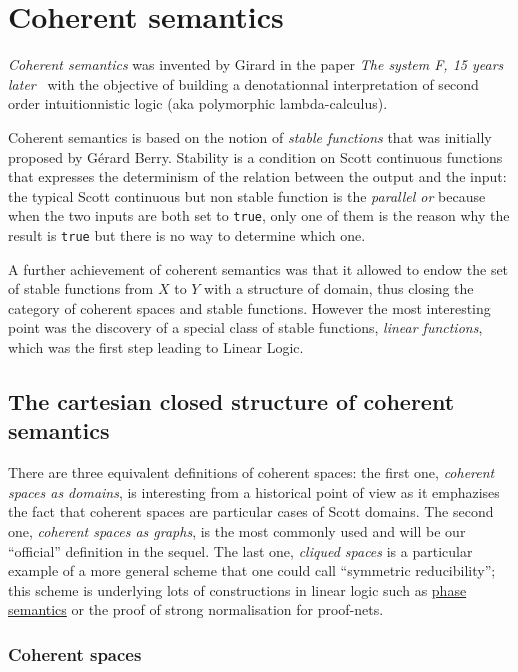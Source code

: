 \chapter{Coherent semantics}\label{coherent-semantics}

\emph{Coherent semantics} was invented by Girard in the paper \emph{The
system F, 15 years later}~\cite{systemF15} with the objective of building a
denotationnal interpretation of second order intuitionnistic logic (aka
polymorphic lambda-calculus).

Coherent semantics is based on the notion of \emph{stable functions}
that was initially proposed by Gérard Berry. Stability is a condition on
Scott continuous functions that expresses the determinism of the
relation between the output and the input: the typical Scott continuous
but non stable function is the \emph{parallel or} because when the two
inputs are both set to \texttt{true}, only one of them is the reason why
the result is \texttt{true} but there is no way to determine which one.

A further achievement of coherent semantics was that it allowed to endow
the set of stable functions from \(X\) to \(Y\) with a structure of
domain, thus closing the category of coherent spaces and stable
functions. However the most interesting point was the discovery of a
special class of stable functions, \emph{linear functions}, which was
the first step leading to Linear Logic.

\section{The cartesian closed structure of coherent semantics}\label{the-cartesian-closed-structure-of-coherent-semantics}

There are three equivalent definitions of coherent spaces: the first
one, \emph{coherent spaces as domains}, is interesting from a historical
point of view as it emphazises the fact that coherent spaces are
particular cases of Scott domains. The second one, \emph{coherent spaces
as graphs}, is the most commonly used and will be our ``official''
definition in the sequel. The last one, \emph{cliqued spaces} is a
particular example of a more general scheme that one could call
``symmetric reducibility''; this scheme is underlying lots of
constructions in linear logic such as \hyperref[phase-semantics]{phase
semantics} or the proof of strong normalisation for proof-nets.

\subsection{Coherent spaces}\label{coherent-spaces}

